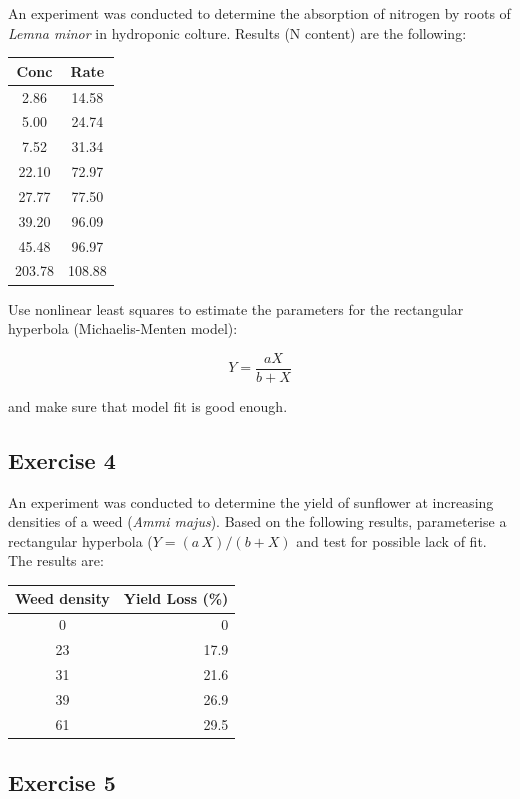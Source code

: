 \documentclass[a4paper,12pt,oneside]{book}
\begin{document}
An experiment was conducted to determine the absorption of nitrogen by roots of \emph{Lemna minor} in hydroponic colture. Results (N content) are the following:

\begin{longtable}[]{@{}cc@{}}
\toprule
Conc & Rate \\
\midrule
\endhead
2.86 & 14.58 \\
5.00 & 24.74 \\
7.52 & 31.34 \\
22.10 & 72.97 \\
27.77 & 77.50 \\
39.20 & 96.09 \\
45.48 & 96.97 \\
203.78 & 108.88 \\
\bottomrule
\end{longtable}

Use nonlinear least squares to estimate the parameters for the rectangular hyperbola (Michaelis-Menten model):

\[Y = \frac{a X} {b + X}\]

and make sure that model fit is good enough.

\hypertarget{exercise-4-4}{%
\subsection{Exercise 4}\label{exercise-4-4}}

An experiment was conducted to determine the yield of sunflower at increasing densities of a weed (\emph{Ammi majus}). Based on the following results, parameterise a rectangular hyperbola (\(Y = (a \, X)/(b + X)\) and test for possible lack of fit. The results are:

\begin{longtable}[]{@{}cr@{}}
\toprule
Weed density & Yield Loss (\%) \\
\midrule
\endhead
0 & 0 \\
23 & 17.9 \\
31 & 21.6 \\
39 & 26.9 \\
61 & 29.5 \\
\bottomrule
\end{longtable}

\hypertarget{exercise-5-3}{%
\subsection{Exercise 5}\label{exercise-5-3}}
\end{document}
